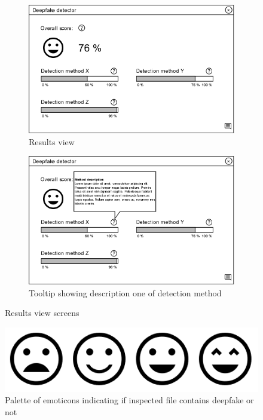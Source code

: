 \begin{figure}[H]
    \begin{subfigure}[h]{.475\linewidth}
        \centering
        \includegraphics[width=1\linewidth]{other-fig/client_wireframe_results.png}
        \caption{Results view}
    \end{subfigure}
    \hfill
    \begin{subfigure}[h]{.475\linewidth}
        \centering
        \includegraphics[width=1\linewidth]{other-fig/client_wireframe_results2.png}
        \caption{Tooltip showing description one of detection method}
    \end{subfigure} 
    \caption{Results view screens}
    \label{fig:client_wireframe_results}
\end{figure}

\begin{figure}[H]
    \centering
    \includegraphics[width=.4\linewidth]{other-fig/client_wireframe_results3.png}
    \caption{Palette of emoticons indicating if inspected file contains deepfake or not}
\label{fig:client_wireframe_results3}
\end{figure}

